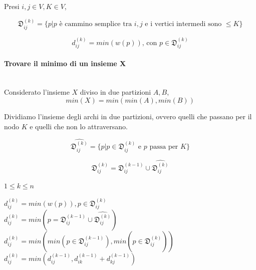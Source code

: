 \documentclass[tikz]{article}
\let\oldparagraph\paragraph
\renewcommand{\paragraph}[1]{\oldparagraph{#1}\mbox{}}
\begin{document}
{{Presi $i,j \in V, K \in V$, 

\begin{equation}
\mathfrak{D}_{ij}^{(k)} = \{p | p \mbox{ è cammino semplice tra } i,j \mbox{ e i vertici intermedi sono }\leq K \}
\end{equation}


\begin{equation}
d_{ij}^{(k)} = min(w(p))\mbox{, con }p \in \mathfrak{D}_{ij}^{(k)}
\end{equation}



\begin{framed}
\paragraph{Trovare il minimo di un insieme X} \\
Considerato l'insieme $X$ diviso in due partizioni $A,B$,
\begin{equation}
min(X) = min(min(A),min(B))
\end{equation}
\end{framed}

Dividiamo l'insieme degli archi in due partizioni, ovvero quelli che passano per il nodo $K$ e quelli che non lo attraversano.

\begin{equation}
\hat{\mathfrak{D}_{ij}^{(k)}} = \{p | p \in \mathfrak{D}_{ij}^{(k)} \mbox{ e } p \mbox{ passa per } K \}
\end{equation}

\begin{equation}
\mathfrak{D}_{ij}^{(k)} = \mathfrak{D}_{ij}^{(k-1)} \cup \hat{\mathfrak{D}_{ij}^{(k)}} 
\end{equation}

$1 \leq k \leq n$

$d_{ij}^{(k)} = min(w(p)), p \in \mathfrak{D}_{ij}^{(k)}$ \\ 
$d_{ij}^{(k)} = min(p=\mathfrak{D}_{ij}^{(k-1)} \cup \hat{\mathfrak{D}_{ij}^{(k)}} )$ \\ 
$d_{ij}^{(k)} = min(min(p \in \mathfrak{D}_{ij}^{(k-1)}), min(p \in \hat{\mathfrak{D}_{ij}^{(k)}} ))$ \\ 


$d_{ij}^{(k)} = min(d_{ij}^{(k-1)}, d_{ik}^{(k-1)} + d_{kj}^{(k-1)} )$ \\ 





}}
\end{document}

